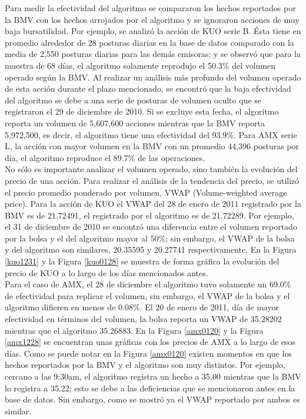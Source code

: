 \documentclass[11pt]{article}
\numberwithin{equation}{section} %
\begin{document}
Para medir la efectividad del algoritmo se compararon los hechos reportados por la BMV con los hechos arrojados por el algoritmo y se ignoraron acciones de muy baja bursatilidad. Por ejemplo, se analizó la acción de KUO serie B. Ésta tiene en promedio alrededor de 28 posturas diarias en la base de datos comparado con la media de 2,550 posturas diarias para las demás emisoras; y se observó que para la muestra de 68 días, el algoritmo solamente reprodujo el 50.3\% del volumen operado según la BMV. Al realizar un análisis más profundo del volumen operado de esta acción durante el plazo mencionado, se encontró que la baja efectividad del algoritmo se debe a una serie de posturas de volumen oculto que se registraron el 29 de diciembre de 2010. Si se excluye esta fecha, el algoritmo reporta un volumen de 5,607,600 acciones mientras que la BMV reporta 5,972,500, es decir, el algoritmo tiene una efectividad del 93.9\%. Para AMX serie L, la acción con mayor volumen en la BMV con un promedio 44,396 posturas por día, el algoritmo reproduce el 89.7\% de las operaciones.\\


No sólo es importante analizar el volumen operado, sino también la evolución del precio de una acción. Para realizar el análisis de la tendencia del precio, se utilizó el precio promedio ponderado por volumen, VWAP (Volume-weighted average price). Para la acción de KUO el VWAP del 28 de enero de 2011 registrado por la BMV es de 21.72491, el registrado por el algoritmo es de 21.72289. Por ejemplo, el 31 de diciembre de 2010 se encontró una diferencia entre el volumen reportado por la bolsa y el del algoritmo mayor al 50\%; sin embargo, el VWAP de la bolsa y del algoritmo son similares, 20.35595 y 20.27741 respectivamente. En la Figura \ref{kuo1231} y la Figura \ref{kuo0128} se muestra de forma gráfica la evolución del precio de KUO a lo largo de los días mencionados antes.\\

Para el caso de AMX, el 28 de diciembre el algoritmo tuvo solamente un 69.0\% de efectividad para replicar el volumen, sin embargo, el VWAP de la bolsa y el algoritmo difieren en menos de 0.08\%. El 20 de enero de 2011, día de mayor efectividad en términos del volumen, la bolsa reporta un VWAP de 35.28202 mientras que el algoritmo 35.26883. En la Figura \ref{amx0120} y la Figura \ref{amx1228} se encuentran unas gráficas con los precios de AMX a lo largo de esos días. Como se puede notar en la Figura \ref{amx0120} existen momentos en que los hechos reportados por la BMV y el algoritmo son muy distintos. Por ejemplo, cercano a las 9:30am, el algoritmo registra un hecho a 35.00 mientras que la BMV lo registra a 35.22; esto se debe a las deficiencias que se mencionaron antes en la base de datos. Sin embargo, como se mostró ya el VWAP reportado por ambos es similar.
\end{document}
